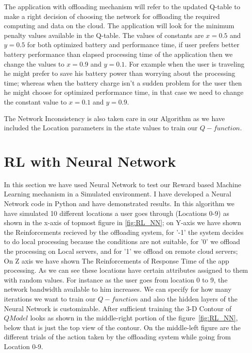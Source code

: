 \documentclass{report}
\begin{document}
The application with offloading mechanism will refer to the updated Q-table to make a right decision of choosing the network
for offloading the required computing and data on the cloud. The application will look for the minimum penalty values available in the Q-table. The values of constants are $ x = 0.5 $ and $ y = 0.5 $ for both optimized battery and performance time, if user prefers better battery performance than elapsed processing time of the application then we change the values to $ x = 0.9 $ and $ y = 0.1 $. For example when the user is traveling he might prefer to save his battery power than worrying about the processing time; whereas when the battery charge isn't a sudden problem for the user then he might choose for optimized performance time, in that case we need to change the constant value to $x = 0.1$ and $y = 0.9$.

The Network Inconsistency is also taken care in our Algorithm as we have included the Location parameters in the state values to train our $Q-function$.

\section{RL with Neural Network}
In this section we have used Neural Network to test our Reward based Machine Learning mechanism in a Simulated environment.
I have developed a Neural Network code in Python and have demonstrated results.
In this algorithm we have simulated 10 different locations a user goes through (Locations 0-9) as shown in the x-axis of topmost figure in \ref{fig:RL_NN}; on Y-axis we have shown the Reinforcements recieved by the offloading system, for '-1' the system decides to do local processing because the conditions are not suitable, for '0' we offload the processing on Local servers, and for '1' we offload on remote cloud servers; On Z axis we have shown The Reinforcements of Response Time of the app processing. As we can see these locations have certain attributes assigned to them with random values. For instance as the user goes from location 0 to 9, the network bandwidth available to him increases.
We can specify for how many iterations we want to train our $Q-function$ and also the hidden layers of the Neural Network is customizable. After sufficient training the 3-D Contour of $Q Model$ looks as shown in the middle-right portion of the figure~\ref{fig:RL_NN}, below that is just the top view of the contour. On the middle-left figure are the different trials of the action taken by the offloading system while going from Location 0-9.   
\end{document}

